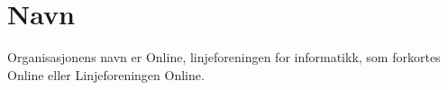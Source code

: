 \chapter{Navn}
\vspace{23pt}
Organisasjonens navn er Online, linjeforeningen for informatikk, som forkortes Online eller Linjeforeningen Online.

